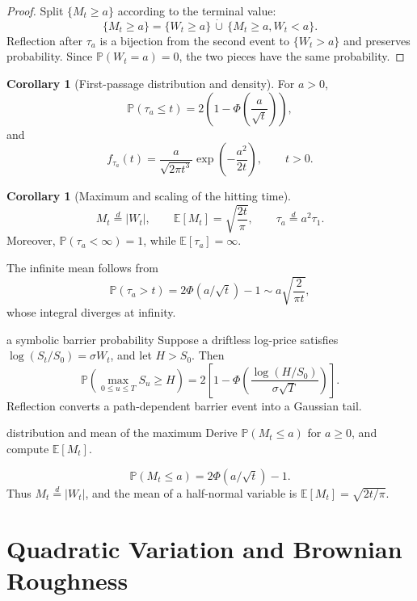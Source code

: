 \documentclass[10pt]{article}
\newcommand{\E}{\mathbb E}
\newcommand{\Pbb}{\mathbb P}
\newcommand{\1}{\mathbf 1}
\theoremstyle{definition}
\newtheorem{corollary}[definition]{Corollary}
\begin{document}
\begin{proof}
Split \(\{M_t\geq a\}\) according to the terminal value:
\[
\{M_t\geq a\}
=\{W_t\geq a\}\,\dot\cup\,
\{M_t\geq a,W_t<a\}.
\]
Reflection after \(\tau_a\) is a bijection from the second event to
\(\{W_t>a\}\) and preserves probability. Since \(\Pbb(W_t=a)=0\), the two
pieces have the same probability.
\end{proof}

\begin{corollary}[First-passage distribution and density]
For \(a>0\),
\[
\Pbb(\tau_a\leq t)
=2\left(1-\Phi\!\left(\frac{a}{\sqrt t}\right)\right),
\]
and
\[
f_{\tau_a}(t)
=\frac{a}{\sqrt{2\pi t^3}}
\exp\!\left(-\frac{a^2}{2t}\right),
\qquad t>0.
\]
\end{corollary}

\begin{corollary}[Maximum and scaling of the hitting time]
\[
M_t\overset d=|W_t|,
\qquad
\E[M_t]=\sqrt{\frac{2t}{\pi}},
\qquad
\tau_a\overset d=a^2\tau_1.
\]
Moreover, \(\Pbb(\tau_a<\infty)=1\), while \(\E[\tau_a]=\infty\).
\end{corollary}

The infinite mean follows from
\[
\Pbb(\tau_a>t)
=2\Phi(a/\sqrt t)-1
\sim a\sqrt{\frac{2}{\pi t}},
\]
whose integral diverges at infinity.

\begin{boardexample}{a symbolic barrier probability}
Suppose a driftless log-price satisfies
\(\log(S_t/S_0)=\sigma W_t\), and let \(H>S_0\). Then
\[
\Pbb\!\left(\max_{0\leq u\leq T}S_u\geq H\right)
=2\left[1-\Phi\!\left(
\frac{\log(H/S_0)}{\sigma\sqrt T}
\right)\right].
\]
Reflection converts a path-dependent barrier event into a Gaussian tail.
\end{boardexample}

\begin{studentexercise}{distribution and mean of the maximum}
Derive \(\Pbb(M_t\leq a)\) for \(a\geq0\), and compute \(\E[M_t]\).
\end{studentexercise}
\begin{shortsolution}
\[
\Pbb(M_t\leq a)=2\Phi(a/\sqrt t)-1.
\]
Thus \(M_t\overset d=|W_t|\), and the mean of a half-normal variable is
\(\E[M_t]=\sqrt{2t/\pi}\).
\end{shortsolution}

\section{Quadratic Variation and Brownian Roughness}
\end{document}
